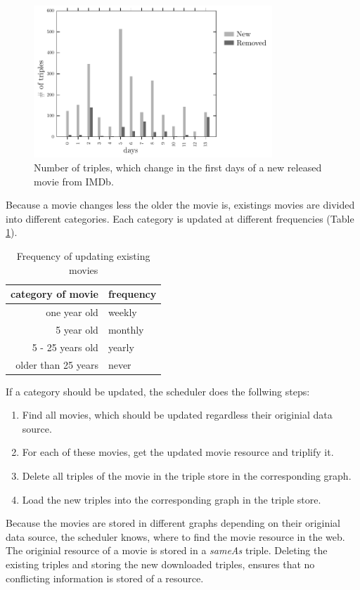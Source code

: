 \begin{figure}[h!]
  \begin{center}
  \includegraphics[width=0.8\textwidth]{images/updating_2.pdf}
  \end{center}
  \caption{Number of triples, which change in the first days of a new released movie from IMDb.}
  \label{fig_new_movie}
\end{figure}

Because a movie changes less the older the movie is, existings movies are divided into different categories.
Each category is updated at different frequencies (Table \ref{tab_updating_existing}).
\begin{table}[ht]
	\begin{center}
	\begin{tabular}{rl}
		\textbf{category of movie} & \textbf{frequency} \\ \hline
		one year old & weekly \\
		5 year old & monthly \\
		5 - 25 years old & yearly \\
		older than 25 years & never \\
	\end{tabular}
	\end{center}
	\caption{Frequency of updating existing movies}
	\label{tab_updating_existing}
\end{table}
If a category should be updated, the scheduler does the follwing steps:
\begin{enumerate}
	\item Find all movies, which should be updated regardless their originial data source.
	\item For each of these movies, get the updated movie resource and triplify it.
	\item Delete all triples of the movie in the triple store in the corresponding graph.
	\item Load the new triples into the corresponding graph in the triple store.
\end{enumerate}
Because the movies are stored in different graphs depending on their originial data source, the scheduler knows, where to find the movie resource in the web.
The originial resource of a movie is stored in a \emph{sameAs} triple.
Deleting the existing triples and storing the new downloaded triples, ensures that no conflicting information is stored of a resource.